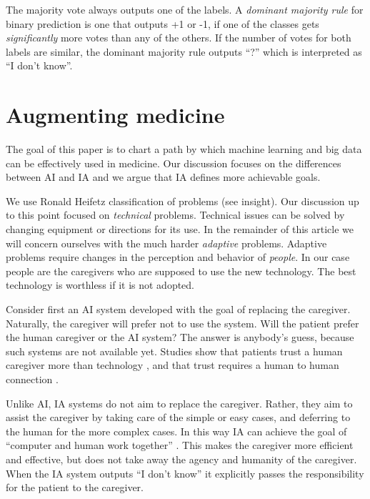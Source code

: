 \documentclass[11pt]{pnas-new}
\begin{document}
The majority vote always outputs one of the labels. A {\em dominant
  majority rule} for binary prediction is one that outputs +1 or -1,
if one of the classes gets {\em significantly} more votes than any of
the others. If the number of votes for both labels are similar, the
dominant majority rule outputs ``?'' which is interpreted as ``I don't
know''.

\section{Augmenting medicine}


The goal of this paper is to chart a path by which machine learning
and big data can be effectively used in medicine. Our discussion
focuses on the differences between AI and IA and we argue that IA
defines more achievable goals.

We use Ronald Heifetz classification of problems (see insight). Our
discussion up to this point focused on {\em technical}
problems. Technical issues can be solved by changing equipment or
directions for its use. In the remainder of this article we will
concern ourselves with the much harder {\em adaptive}
problems. Adaptive problems require changes in the perception and
behavior of {\em people}. In our case people are the caregivers who
are supposed to use the new technology. The best technology is
worthless if it is not adopted.

Consider first an AI system developed with the goal of replacing the
caregiver. Naturally, the caregiver will prefer not to use the
system. Will the patient prefer the human caregiver or the AI system?
The answer is anybody's guess, because such systems are not available
yet. Studies show that patients trust a human caregiver more than
technology \cite{ongena2020patients}, and that trust requires a human
to human connection \cite{nundy2019promoting}.

Unlike AI, IA systems do not aim to replace the caregiver. Rather,
they aim to assist the caregiver by taking care of the simple or easy
cases, and deferring to the human for the more complex cases. In this way IA can 
achieve the goal of ``computer and human work together'' \cite{verghese2018computer}. 
This makes the caregiver more efficient and effective, but does
not take away the agency and humanity of the caregiver. When the IA system outputs
``I don't know'' it explicitly passes the responsibility for the
patient to the caregiver.

\end{document}

